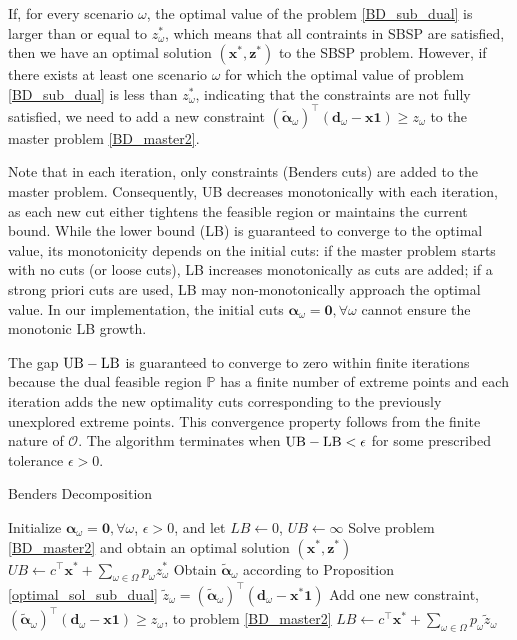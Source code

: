If, for every scenario $\omega$, the optimal value of the problem \eqref{BD_sub_dual} is larger than or equal to $z_{\omega}^{*}$, which means that all contraints in SBSP are satisfied, then we have an optimal solution $(\mathbf{x}^{*}, \mathbf{z}^{*})$ to the SBSP problem. However, if there exists at least one scenario $\omega$ for which the optimal value of problem \eqref{BD_sub_dual} is less than $z_{\omega}^{*}$, indicating that the constraints are not fully satisfied, we need to add a new constraint $(\bm{\tilde{\alpha}}_{\omega})^{\intercal}(\mathbf{d}_{\omega} - \mathbf{x} \mathbf{1}) \geq z_{\omega}$ to the master problem \eqref{BD_master2}.

Note that in each iteration, only constraints (Benders cuts) are added to the master problem. Consequently, UB decreases monotonically with each iteration, as each new cut either tightens the feasible region or maintains the current bound.
While the lower bound (LB) is guaranteed to converge to the optimal value, its monotonicity depends on the initial cuts:
if the master problem starts with no cuts (or loose cuts), LB increases monotonically as cuts are added; if a strong priori cuts are used, LB may non-monotonically approach the optimal value. In our implementation, the initial cuts $\bm{\alpha}_{\omega} = \mathbf{0}, \forall \omega$ cannot ensure the monotonic LB growth.

The gap $\textup{UB} - \textup{LB}$ is guaranteed to converge to zero within finite iterations because the dual feasible region $\mathbb{P}$ has a finite number of extreme points and each iteration adds the new optimality cuts corresponding to the previously unexplored extreme points. This convergence property follows from the finite nature of $\mathcal{O}$. The algorithm terminates when $\textup{UB} - \textup{LB} < \epsilon$ for some prescribed tolerance $\epsilon >0$.

\begin{algorithm}[h]
  \caption{Benders Decomposition}\label{cut_algo}
  Initialize $\bm{\alpha}_{\omega} = \mathbf{0}, \forall \omega$, $\epsilon >0$, and let $LB \gets 0$, $UB \gets \infty$\;
    {Solve problem \eqref{BD_master2} and obtain an optimal solution $(\mathbf{x}^{*}, \mathbf{z}^{*})$\;
    $UB \gets c^{\intercal} \mathbf{x}^{*} + \sum_{\omega \in \Omega} p_{\omega} z_{\omega}^{*}$\;
    {Obtain $\bm{\tilde{\alpha}}_{\omega}$ according to Proposition \ref{optimal_sol_sub_dual}\; $\tilde{z}_{\omega}= (\bm{\tilde{\alpha}}_{\omega})^{\intercal}(\mathbf{d}_{\omega}- \mathbf{x}^{*} \mathbf{1})$\;
    {Add one new constraint, $(\bm{\tilde{\alpha}}_{\omega})^{\intercal}(\mathbf{d}_{\omega}- \mathbf{x} \mathbf{1}) \geq z_{\omega}$, to problem \eqref{BD_master2}\;}
    }
    {$LB \gets c^{\intercal} \mathbf{x}^{*} + \sum_{\omega \in \Omega} p_{\omega} \tilde{z}_{\omega} $\;}
    }
\end{algorithm}

